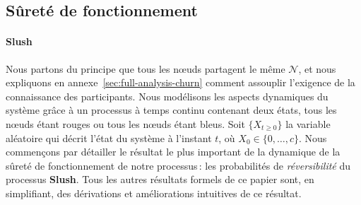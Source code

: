 \documentclass[letterpaper,twocolumn,10pt]{article}
\theoremstyle{definition}
\begin{document}



\subsection{Sûreté de fonctionnement}


\paragraph{Slush}
Nous partons du principe que tous les nœuds partagent le même $\mathcal{N}$, et 
nous expliquons en annexe~\ref{sec:full-analysis-churn} comment assouplir l'exigence de la connaissance des participants. Nous modélisons
les aspects dynamiques du système grâce à un processus à temps continu contenant deux états, tous les nœuds étant rouges ou tous  %
les nœuds étant bleus. Soit $\{X_{t \geq 0}\}$ la variable aléatoire qui décrit l'état du système à l'instant $t$, où
$X_0 \in \{0, \dots, c\}$.
Nous commençons par détailler le résultat le plus important de la dynamique de la sûreté de fonctionnement de notre
processus\,: les probabilités de \emph{réversibilité} du processus \textbf{Slush}. Tous les autres résultats formels de
ce papier sont, en simplifiant, des dérivations et améliorations intuitives de ce résultat.
\end{document}
